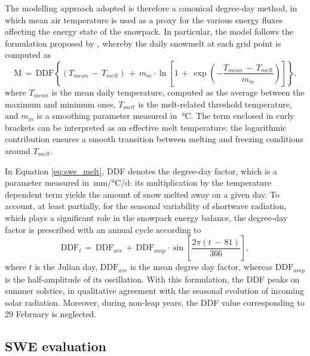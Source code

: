 The modelling approach adopted is therefore a canonical degree-day method, in which mean air temperature is used as a proxy for the various energy fluxes 
affecting the energy state of the snowpack. In particular, the model follows the formulation proposed by \textcite{Magnusson_DDF}, whereby the daily snowmelt 
at each grid point is computed as 
\begin{equation}
    \text{M}\,=\,\text{DDF}\left\{\left(T_{mean}\,-\,T_{melt}\right)\,+\,m_m \cdot \ln\left[1\,+\,\exp\left(-\frac{T_{mean}\,-\,T_{melt}}{m_m}\right)\right]\right\}.
    \label{eq:swe_melt}
\end{equation}
where $T_{mean}$ is the mean daily temperature, computed as the average between the maximum and minimum ones, $T_{melt}$ is the melt-related threshold 
temperature, and $m_m$ is a smoothing parameter measured in $\SI{}{\degreeCelsius}$. The term enclosed in curly brackets can be interpreted as an effective 
melt temperature: the logarithmic contribution ensures a smooth transition between melting and freezing conditions around $T_{melt}$.

In Equation \eqref{eq:swe_melt},  DDF denotes the degree-day factor, which is a parameter measured in $\SI{}{\milli\meter\per\degreeCelsius\per\day}$: 
its multiplication by the temperature dependent term yields the amount of snow melted away on a given day. To account, at least partially, for the seasonal 
variability of shortwave radiation, which plays a significant role in the snowpack energy balance, the degree-day factor is prescribed with an annual cycle 
according to
\begin{equation}
    \text{DDF}_{t}\,=\,\text{DDF}_{ave}\,+\,\text{DDF}_{amp}\cdot\sin\left[\frac{2\pi \left(t\,-\,81\right)}{366}\right],
    \label{eq:swe_ddf}
\end{equation}
where $t$ is the Julian day, $\text{DDF}_{ave}$ is the mean degree day factor, whereas $\text{DDF}_{amp}$ is the half-amplitude of its oscillation. 
With this formulation, the DDF peaks on summer solstice, in qualitative agreement with the seasonal evolution of incoming solar radiation. Moreover, 
during non-leap years, the DDF value corresponding to 29 February is neglected.



\subsection{SWE evaluation}

